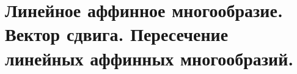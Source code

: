 \section{
    Линейное аффинное многообразие. Вектор сдвига. Пересечение линейных аффинных многообразий. 
}




\newpage



